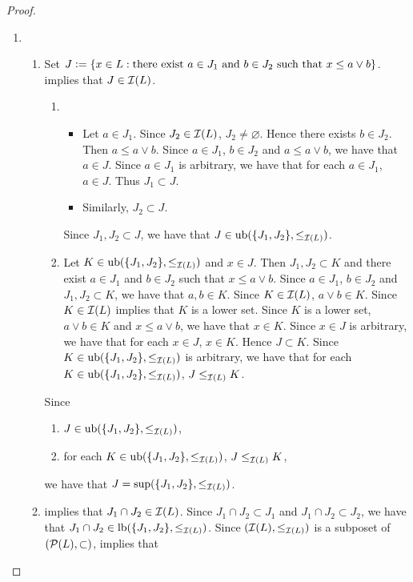 \documentclass{book}
\begin{document}
	\begin{proof}\
		\begin{enumerate}
			\item 
			\begin{enumerate}
				\item Set $J \vcentcolon= \{x \in L: \text{there exist $a \in J_1$ and $b \in J_2$ such that $x \leq a \vee b$} \}$.  implies that $J \in \mathcal{I}(L)$.
				\begin{enumerate}
					\item 
					\begin{itemize}
						\item Let $a \in J_1$. Since $J_2 \in \mathcal{I}(L)$, $J_2 \neq \varnothing$. Hence there exists $b \in J_2$. Then $a \leq a \vee b$. Since $a \in J_1$, $b \in J_2$ and $a \leq a \vee b$, we have that $a \in J$. Since $a \in J_1$ is arbitrary, we have that for each $a \in J_1$, $a \in J$. Thus $J_1 \subset J$. 
						\item Similarly, $J_2 \subset J$.
					\end{itemize}
					Since $J_1,J_2 \subset J$, we have that $J \in \operatorname{ub}(\{J_1, J_2\}, \leq_{\mathcal{I}(L)})$. 
					\item Let $K \in \operatorname{ub}(\{J_1, J_2\}, \leq_{\mathcal{I}(L)})$ and $x \in J$. Then $J_1, J_2 \subset K$ and there exist $a \in J_1$ and $b \in J_2$ such that $x \leq a \vee b$. Since $a \in J_1$, $b \in J_2$ and $J_1, J_2 \subset K$, we have that $a,b \in K$. Since $K \in \mathcal{I}(L)$, $a \vee b \in K$. Since $K \in \mathcal{I}(L)$  implies that $K$ is a lower set. Since $K$ is a lower set, $a \vee b \in K$ and $x \leq a \vee b$, we have that $x \in K$. Since $x \in J$ is arbitrary, we have that for each $x \in J$, $x \in K$. Hence $J \subset K$. Since $K \in \operatorname{ub}(\{J_1, J_2\}, \leq_{\mathcal{I}(L)})$ is arbitrary, we have that for each $K \in \operatorname{ub}(\{J_1, J_2\}, \leq_{\mathcal{I}(L)})$, $J \leq_{\mathcal{I}(L)} K$.
				\end{enumerate}
				Since 
				\begin{enumerate}
					\item $J \in \operatorname{ub}(\{J_1, J_2\}, \leq_{\mathcal{I}(L)})$, 
					\item for each $K \in \operatorname{ub}(\{J_1, J_2\}, \leq_{\mathcal{I}(L)})$, $J \leq_{\mathcal{I}(L)} K$,
				\end{enumerate}
				we have that $J = \sup(\{J_1, J_2\}, \leq_{\mathcal{I}(L)})$.
				\item {} implies that $J_1 \cap J_2 \in \mathcal{I}(L)$. Since $J_1 \cap J_2 \subset J_1$ and $J_1 \cap J_2 \subset J_2$, we have that $J_1 \cap J_2 \in \operatorname{lb}(\{J_1, J_2\}, \leq_{\mathcal{I}(L)})$. Since $(\mathcal{I}(L), \leq_{\mathcal{I}(L)})$ is a subposet of $(\mathcal{P}(L), \subset)$,  implies that

\end{enumerate}
\end{enumerate}
\end{proof}
\end{document}
